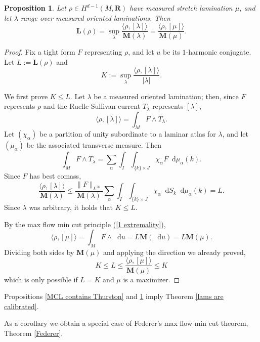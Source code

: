 \documentclass[reqno,11pt]{amsart}
\newcommand{\RR}{\mathbf{R}}
\newcommand*\dif{\mathop{}\!\mathrm{d}}
\newcommand{\Mass}{\mathbf M}
\newcommand{\Comass}{\mathbf L}
\newtheorem{proposition}[theorem]{Proposition}
\theoremstyle{definition}
\numberwithin{equation}{section}
\begin{document}
\begin{proposition}\label{L equals K}
	Let $\rho \in H^{d - 1}(M, \RR)$ have measured stretch lamination $\mu$, and let $\lambda$ range over measured oriented laminations. Then 
	$$\Comass(\rho) = \sup_\lambda \frac{\langle \rho, [\lambda]\rangle}{\Mass(\lambda)} = \frac{\langle \rho, [\mu]\rangle}{\Mass(\mu)}.$$
\end{proposition}
\begin{proof}
Fix a tight form $F$ representing $\rho$, and let $u$ be its $1$-harmonic conjugate.
Let $L := \Comass(\rho)$ and
$$K :=  \sup_\lambda \frac{\langle \rho, [\lambda]\rangle}{|\lambda|}.$$

We first prove $K \leq L$.
Let $\lambda$ be a measured oriented lamination; then, since $F$ represents $\rho$ and the Ruelle-Sullivan current $T_\lambda$ represents $[\lambda]$,
$$\langle \rho, [\lambda]\rangle = \int_M F \wedge T_\lambda.$$
Let $(\chi_\alpha)$ be a partition of unity subordinate to a laminar atlas for $\lambda$, and let $(\mu_\alpha)$ be the associated transverse measure. Then 
$$\int_M F \wedge T_\lambda = \sum_\alpha \int_I \int_{\{k\} \times J} \chi_\alpha F \dif \mu_\alpha(k).$$
Since $F$ has best comass,
$$\frac{\langle \rho, [\lambda] \rangle}{\Mass(\lambda)}
\leq \frac{\|F\|_{L^\infty}}{\Mass(\lambda)} \sum_\alpha \int_I \int_{\{k\} \times J} \chi_\alpha \dif S_k \dif \mu_\alpha(k) = L.$$
Since $\lambda$ was arbitrary, it holds that $K \leq L$.

By the max flow min cut principle (\ref{1 extremality}),
$$\langle \rho, [\mu]\rangle = \int_M F \wedge \dif u = L \Mass(\dif u) = L \Mass(\mu).$$
Dividing both sides by $\Mass(\mu)$ and applying the direction we already proved,
$$K \leq L \leq \frac{\langle \rho, [\mu]\rangle}{\Mass(\mu)} \leq K$$
which is only possible if $L = K$ and $\mu$ is a maximizer.
\end{proof}

Propositions \ref{MCL contains Thurston} and \ref{L equals K} imply Theorem \ref{lams are calibrated}.

As a corollary we obtain a special case of Federer's max flow min cut theorem, Theorem \ref{Federer}.
\end{document}
